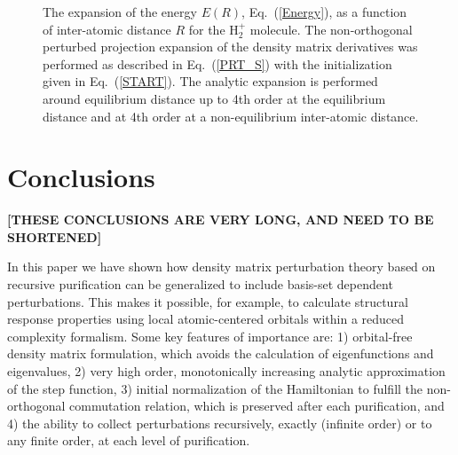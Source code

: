 \documentclass[twocolumn,showpacs,preprintnumbers,amsmath,amssymb]{revtex4}
\begin{document}
\begin{figure}[t]
\caption{\label{H2}
The expansion of the energy $E(R)$, Eq.\ (\ref{Energy}), as a function of inter-atomic 
distance $R$ for the H$_2^+$ molecule.
The non-orthogonal perturbed projection expansion of the density matrix derivatives was
performed as described in Eq.\ (\ref{PRT_S}) with the initialization given in
Eq.\ (\ref{START}). The analytic expansion is performed around equilibrium distance
up to 4th order at the equilibrium distance and at 4th order at a
non-equilibrium inter-atomic distance.}
\end{figure}

\section{Conclusions}

{\bf [THESE CONCLUSIONS ARE VERY LONG, AND NEED TO BE SHORTENED]}

In this paper we have shown how density matrix perturbation theory based on recursive purification 
can be generalized to include basis-set dependent perturbations. This makes
it possible, for example, to calculate structural response properties 
using local atomic-centered orbitals within a reduced complexity formalism. 
Some key features of importance are: 1) orbital-free density matrix formulation,
which avoids the calculation of eigenfunctions and eigenvalues, 2) very high order, monotonically 
increasing analytic approximation of the step function, 3) initial normalization of the Hamiltonian 
to fulfill the non-orthogonal commutation relation, which is preserved after each purification, 
and 4) the ability to collect perturbations recursively, exactly (infinite order) or to any finite 
order, at each level of purification.
\end{document}

